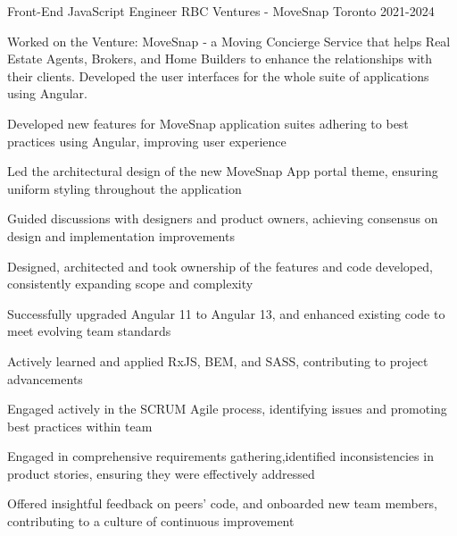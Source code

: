 

\begin{cventries}
	
	
  \cventry
{Front-End JavaScript Engineer} %
{RBC Ventures - MoveSnap} %
{Toronto} %
{2021-2024} %
{Worked on the Venture: MoveSnap ‑ a Moving Concierge Service that helps Real Estate Agents, Brokers, and Home Builders to enhance the relationships with their clients. Developed the user interfaces for the whole suite of applications using Angular.
	\vspace{6.0mm}
	\begin{cvitems}
		\item
		{Developed new features for MoveSnap application suites adhering to best practices using Angular, improving user experience}
		\item
		{Led the architectural design of the new MoveSnap App portal theme, ensuring uniform styling throughout the application}
		\item
		{Guided discussions with designers and product owners, achieving consensus on design and implementation improvements}
		\item
		{Designed, architected and took ownership of the features and code developed, consistently expanding scope and complexity}
		\item
		{Successfully upgraded Angular 11 to Angular 13, and enhanced existing code to meet evolving team standards}
		\item
		{Actively learned and applied RxJS, BEM, and SASS, contributing to project advancements}
		\item
		{Engaged actively in the SCRUM Agile process, identifying issues and promoting best practices within team}
		\item 
		{Engaged in comprehensive requirements gathering,identified inconsistencies in product stories, ensuring they were effectively addressed}
		\item 
		{Offered insightful feedback on peers' code, and onboarded new team members, contributing to a culture of continuous improvement}
		\item

\end{cvitems}}
\end{cventries}
